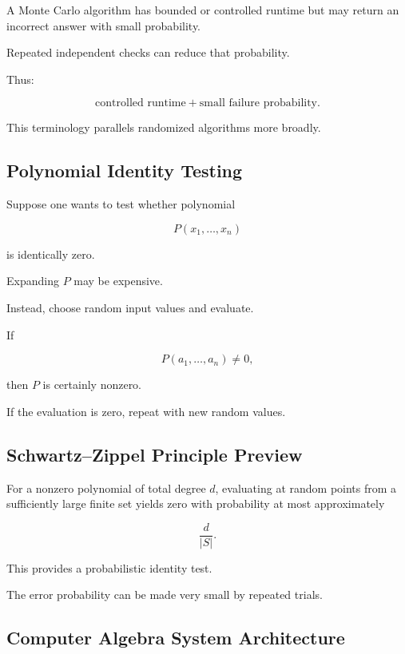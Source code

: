 A Monte Carlo algorithm has bounded or controlled runtime but may return an
incorrect answer with small probability.

Repeated independent checks can reduce that probability.

Thus:

\[
\boxed{
\text{controlled runtime}
+
\text{small failure probability}.
}
\]

This terminology parallels randomized algorithms more broadly.

\subsection{Polynomial Identity Testing}
\label{subsec:polynomial-identity-testing}

Suppose one wants to test whether polynomial

\[
P(x_1,\ldots,x_n)
\]

is identically zero.

Expanding \(P\) may be expensive.

Instead, choose random input values and evaluate.

If

\[
P(a_1,\ldots,a_n)\neq0,
\]

then \(P\) is certainly nonzero.

If the evaluation is zero, repeat with new random values.

\subsection{Schwartz--Zippel Principle Preview}
\label{subsec:schwartz-zippel-preview}

For a nonzero polynomial of total degree \(d\), evaluating at random points
from a sufficiently large finite set yields zero with probability at most
approximately

\[
\boxed{
\frac{d}{|S|}.
}
\]

This provides a probabilistic identity test.

The error probability can be made very small by repeated trials.

\subsection{Computer Algebra System Architecture}
\label{subsec:cas-architecture}

